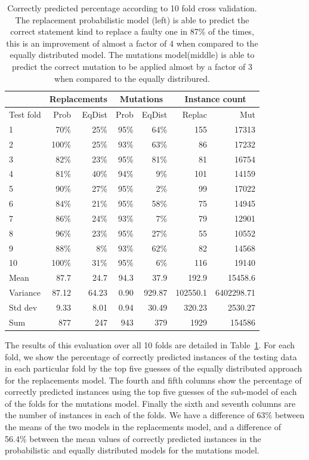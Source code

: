 \documentclass[conference]{IEEEtran}
\begin{document}
\begin{table}[ht]
\begin{tabular}{l|rr|rr|rr}
   &\multicolumn{2}{c|}{Replacements} &\multicolumn{2}{c|}{Mutations}&\multicolumn{2}{c}{Instance count} \\
   	\hline
Test fold	&Prob&	EqDist&Prob&	EqDist & Replac  & Mut\\
	\hline
1	&70\%&	25\% &  95\% & 64\% & 155 &17313 \\
2	&100\%&	25\%  & 93\% & 63\% & 86 & 17232 \\
3	&82\%	&23\% & 95\% & 81\% & 81 & 16754\\
4	&81\%	&40\%  & 94\% & 9\% & 101 & 14159 \\
5	&90\%	&27\%  & 95\% & 2\%& 99 & 17022 \\
6	&84\%	&21\%  & 95\%& 58\%& 75 & 14945 \\
7	&86\%	&24\%  & 93\%& 7\%& 79 & 12901 \\
8	&96\%	&23\%  & 95\%& 27\%& 55 & 10552 \\
9	&88\%	&8\%  & 93\%& 62\%& 82 & 14568\\
10	&100\%	&31\%  & 95\% & 6\%& 116 & 19140\\
	\hline
Mean	&87.7	&24.7  & 94.3 & 37.9 & 192.9 & 15458.6 \\
	\hline
Variance	&87.12&	64.23  & 0.90 & 929.87 & 102550.1 & 6402298.71 \\
	\hline
Std dev	&9.33&	8.01  & 0.94 & 30.49 & 320.23 & 2530.27 \\
	\hline
Sum& 877 & 247 & 943 & 379 & 1929 &  154586\\


\hline
\end{tabular}
\center
  \caption{Correctly predicted percentage according to 10 fold cross
    validation. The replacement probabilistic model (left) is able to predict
    the correct statement kind to replace a faulty one in 87\% of the times,
    this is an improvement of almost a factor of 4 when compared to the equally
    distributed model. The mutations model(middle) is able to predict the
    correct mutation to be applied almost by a factor of 3 when compared to the
    equally distribured.} 
  \label{tab:results10fcv}
\end{table} 


The results of this evaluation over all 10 folds are detailed in
Table~\ref{tab:results10fcv}. For each fold, we show the percentage of correctly 
predicted instances of the testing data in each particular fold by the top five
guesses of the equally distributed approach for the replacements model. The
fourth and fifth columns show the percentage of correctly predicted
instances using the top five  
guesses of the sub-model of each of the folds for the mutations model. Finally the sixth and seventh columns are the number of instances in each of the folds. We have a difference of 63\% between the means of the two models in the replacements model, and a difference of 56.4\% between the mean values of correctly predicted instances in the probabilistic and equally distributed models for the mutations model.
\end{document}
